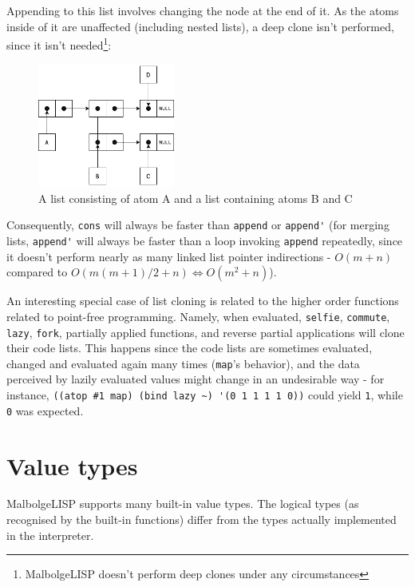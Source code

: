 \par Appending to this list involves changing the node at the end of it. As the atoms inside of it are unaffected (including nested lists), a deep clone isn't performed, since it isn't needed\footnote{MalbolgeLISP doesn't perform deep clones under any circumstances}:

\begin{figure}[H]
\centering
\includegraphics[width=0.4\textwidth]{figures/plist_5.png}
\caption{A list consisting of atom A and a list containing atoms B and C}
\end{figure}

\par Consequently, \verb|cons| will always be faster than \verb|append| or \verb|append'| (for merging lists, \verb|append'| will always be faster than a loop invoking \verb|append| repeatedly, since it doesn't perform nearly as many linked list pointer indirections - $O(m + n)$ compared to $O(m(m+1)/2+n) \Leftrightarrow O(m^2 + n)$).

\par An interesting special case of list cloning is related to the higher order functions related to point-free programming. Namely, when evaluated, \verb|selfie|, \verb|commute|, \verb|lazy|, \verb|fork|, partially applied functions, and reverse partial applications will clone their code lists. This happens since the code lists are sometimes evaluated, changed and evaluated again many times (\verb|map|'s behavior), and the data perceived by lazily evaluated values might change in an undesirable way - for instance, \verb|((atop #1 map) (bind lazy ~) '(0 1 1 1 1 0))| could yield \verb|1|, while \verb|0| was expected.



\section{Value types}

\par MalbolgeLISP supports many built-in value types. The logical types (as recognised by the built-in functions) differ from the types actually implemented in the interpreter.

